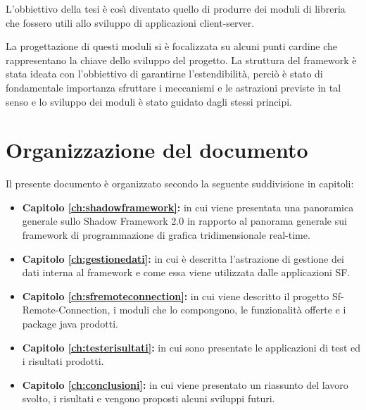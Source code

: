 L'obbiettivo della tesi \`e cos{\`\i} diventato quello di produrre dei moduli di libreria che fossero utili allo sviluppo di applicazioni client-server.

La progettazione di questi moduli si \`e focalizzata su alcuni punti cardine che rappresentano la chiave dello sviluppo del progetto. La struttura del framework \`e stata ideata con l'obbiettivo di garantirne l'estendibilit\`a, perci\`o \`e stato di fondamentale importanza sfruttare i meccanismi e le astrazioni previste in tal senso e lo sviluppo dei moduli \`e stato guidato dagli stessi principi.

\section{Organizzazione del documento}
\label{sec:orgtesi}
Il presente documento \`e organizzato secondo la seguente suddivisione in capitoli:
\begin{itemize}
	\item  \textbf{Capitolo \ref{ch:shadowframework}:} in cui viene presentata una panoramica generale sullo Shadow Framework 2.0 in rapporto al panorama generale sui framework di programmazione di grafica tridimensionale real-time.
	\item  \textbf{Capitolo \ref{ch:gestionedati}:} in cui \`e descritta l'astrazione di gestione dei dati interna al framework e come essa viene utilizzata dalle applicazioni \ac{SF}.
	\item  \textbf{Capitolo \ref{ch:sfremoteconnection}:} in cui viene descritto il progetto Sf-Remote-Connection, i moduli che lo compongono, le funzionalit\`a offerte e i package java prodotti.
	\item  \textbf{Capitolo \ref{ch:testerisultati}:} in cui sono presentate le applicazioni di test ed i risultati prodotti.
	\item  \textbf{Capitolo \ref{ch:conclusioni}:} in cui viene presentato un riassunto del lavoro svolto, i risultati e vengono proposti alcuni sviluppi futuri.
\end{itemize}


